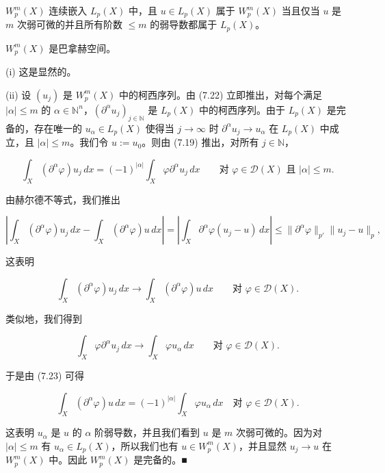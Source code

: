 \begin{theorem}

\begin{subitems}
\item

$ W_p^m(X) $ 连续嵌入 $ L_p(X) $ 中，且 $ u \in L_p(X) $ 属于 $ W_p^m(X) $ 当且仅当 $ u $ 是 $ m $ 次弱可微的并且所有阶数 $ \le m $ 的弱导数都属于 $ L_p(X) $。

\item

$ W_p^m(X) $ 是巴拿赫空间。

\proofhead
(i) 这是显然的。
\end{subitems}

(ii) 设 $ (u_j) $ 是 $ W_p^m(X) $ 中的柯西序列。由 (7.22) 立即推出，对每个满足 $ |\alpha| \le m $ 的 $ \alpha \in \mathbb{N}^n $，$ (\partial^{\alpha} u_j)_{j \in \mathbb{N}} $ 是 $ L_p(X) $ 中的柯西序列。由于 $ L_p(X) $ 是完备的，存在唯一的 $ u_\alpha \in L_p(X) $ 使得当 $ j \to \infty $ 时 $ \partial^{\alpha} u_j \to u_\alpha $ 在 $ L_p(X) $ 中成立，且 $ |\alpha| \le m $。我们令 $ u := u_0 $。则由 (7.19) 推出，对所有 $ j \in \mathbb{N} $，

\begin{equation}
\int_X (\partial^{\alpha}\varphi)u_j\, dx = (-1)^{|\alpha|} \int_X \varphi \partial^{\alpha} u_j\, dx \qquad \text{对 } \varphi \in \mathcal{D}(X) \text{ 且 } |\alpha| \le m .\tag{7.23}
\end{equation}

由赫尔德不等式，我们推出

\[
\left| \int_X (\partial^{\alpha}\varphi)u_j\, dx - \int_X (\partial^{\alpha}\varphi)u\, dx \right| = \left| \int_X \partial^{\alpha}\varphi(u_j - u)\, dx \right| \le \|\partial^{\alpha}\varphi\|_{p'} \|u_j - u\|_p ,
\]

这表明

\[
\int_X (\partial^{\alpha}\varphi)u_j\, dx \to \int_X (\partial^{\alpha}\varphi)u\, dx \qquad \text{对 } \varphi \in \mathcal{D}(X) .
\]

类似地，我们得到

\[
\int_X \varphi \partial^{\alpha} u_j\, dx \to \int_X \varphi u_\alpha\, dx \qquad \text{对 } \varphi \in \mathcal{D}(X) .
\]

于是由 (7.23) 可得

\[
\int_X (\partial^\alpha \varphi) u \, dx = (-1)^{|\alpha|} \int_X \varphi u_\alpha \, dx \quad \text{对 } \varphi \in \mathcal{D}(X) .
\]

这表明 $ u_\alpha $ 是 $ u $ 的 $ \alpha $ 阶弱导数，并且我们看到 $ u $ 是 $ m $ 次弱可微的。因为对 $ |\alpha| \le m $ 有 $ u_\alpha \in L_p(X) $，所以我们也有 $ u \in W_p^m(X) $，并且显然 $ u_j \to u $ 在 $ W_p^m(X) $ 中。因此 $ W_p^m(X) $ 是完备的。\nobreak\hspace{0.35em}■

\end{theorem}

